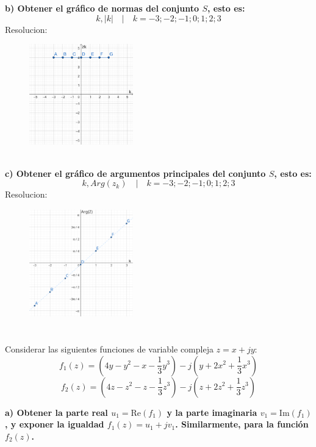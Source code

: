 \documentclass[12pt]{report}
\begin{document}
\vspace{10cm}
\textbf{b) Obtener el gráfico de normas del conjunto $S$, esto es:}
    $$k, |k| \quad | \quad k = -3;-2;-1;0;1;2;3 $$
Resolucion:\\
\begin{figure}[h] %
    \centering %
    \includegraphics[width=0.4\textwidth]{./Imagenes/foto1Ej1.png} %
\end{figure}\\
\textbf{c) Obtener el gráfico de argumentos principales del conjunto $S$, esto es:}
    $$k, Arg(z_k) \quad | \quad k = -3;-2;-1;0;1;2;3 $$
Resolucion:\\
\begin{figure}[h] %
    \centering %
    \includegraphics[width=0.4\textwidth]{./Imagenes/foto2Ej1.png} %
\end{figure}
\chapter{}%
Considerar las siguientes funciones de variable compleja $z = x + jy$:
$$f_1(z) = (4y - y^2 - x - \frac{1}{3}y^3) - j(y + 2x^2 + \frac{1}{3}x^3)$$
$$f_2(z) = (4z - z^2 - z - \frac{1}{3}z^3) - j(z + 2z^2 + \frac{1}{3}z^3)$$

\textbf{a) Obtener la parte real $u_1 = \text{Re}(f_1)$ y la parte imaginaria $v_1 = \text{Im}(f_1)$
, y exponer la igualdad $f_1(z) = u_1 + jv_1$. Similarmente, para la función $f_2(z)$.}\\
\end{document}
